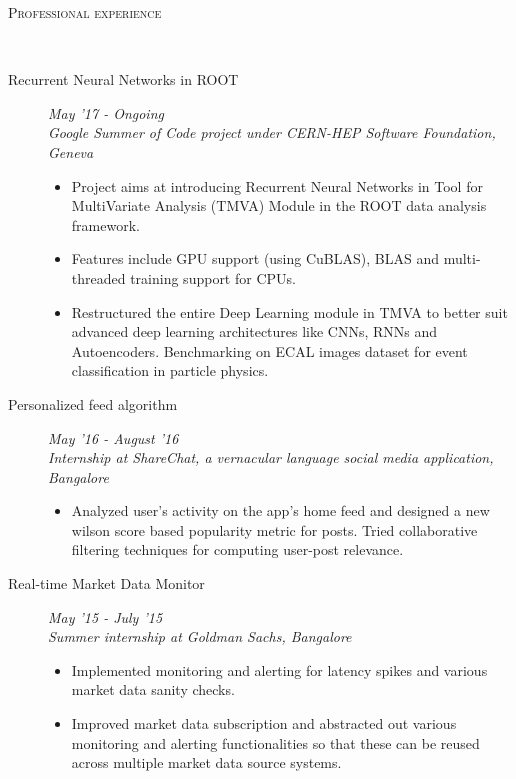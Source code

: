 \documentclass[9pt]{article}
\newenvironment{changemargin}[2]{%
  \begin{list}{}{%
    \setlength{\topsep}{0pt}%
    \setlength{\leftmargin}{#1}%
    \setlength{\rightmargin}{#2}%
    \setlength{\listparindent}{\parindent}%
    \setlength{\itemindent}{\parindent}%
    \setlength{\parsep}{\parskip}%
  }%
  \item[]}{\end{list}
}
\newcommand{\lineover}{
	\begin{changemargin}{-0.05in}{-0.10in}
		\vspace*{-9pt}
		\hrulefill \\
		\vspace*{-2pt}
	\end{changemargin}
}
\newcommand{\header}[1]{
	\begin{changemargin}{-0.5in}{-0.5in}
		\scshape{#1}\\
  	\lineover
	\end{changemargin}
}
\newenvironment{body} {
	\vspace*{-16pt}
	\begin{changemargin}{-0.6in}{-0.65in}
  }	
	{\end{changemargin}
}
\begin{document}
\header{Professional experience}
\begin{body}
 \vspace{14pt}

  \begin{description}
  	
  \item[\normalsize{Recurrent Neural Networks in ROOT}] \hfill \textit{May '17 - Ongoing} \\
  \textit{Google Summer of Code project under CERN-HEP Software Foundation, Geneva}
  \begin{itemize}
  	\item Project aims at introducing Recurrent Neural Networks in Tool for MultiVariate Analysis (TMVA) Module in the ROOT data analysis framework.
   \item Features include GPU support (using CuBLAS), BLAS and multi-threaded training
   support for CPUs.
   \item Restructured the entire Deep Learning module in TMVA to better suit advanced deep learning architectures like CNNs, RNNs and Autoencoders. Benchmarking on ECAL images dataset for event classification in particle physics.
  \end{itemize}
   
  \item [\normalsize{Personalized feed algorithm}] \hfill \textit{May '16 - August '16} \\
  \textit{Internship at ShareChat, a vernacular language social media application, Bangalore} \\
  \begin{itemize}
  	\item Analyzed user's activity on the app's home feed and designed a new wilson 	score based popularity metric for posts. Tried collaborative filtering techniques 
  	for computing user-post relevance.
  \end{itemize}
  	
  \item[\normalsize{Real-time Market Data Monitor}] \hfill \textit{May '15 - July '15} \\
  \textit{Summer internship at Goldman Sachs, Bangalore} 
  \begin{itemize}
   \item Implemented monitoring and alerting for latency spikes and various market data sanity checks.
   \item Improved market data subscription and abstracted out various monitoring and alerting functionalities so that these can be reused across multiple market data source systems.
  \end{itemize}

  \end{description}
  
\end{body}
\end{document}
